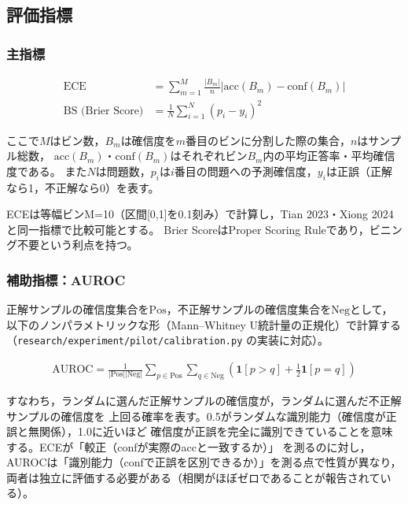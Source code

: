 \documentclass[11pt,a4paper,oneside]{article}
\begin{document}
\subsection{評価指標}

\subsubsection*{主指標}

\begin{align}
  \text{ECE} &= \sum_{m=1}^{M} \frac{|B_m|}{n} \left|\text{acc}(B_m) - \text{conf}(B_m)\right| \\
  \text{BS (Brier Score)} &= \frac{1}{N} \sum_{i=1}^{N} (p_i - y_i)^2
\end{align}

ここで$M$はビン数，$B_m$は確信度を$m$番目のビンに分割した際の集合，$n$はサンプル総数，
$\text{acc}(B_m)$・$\text{conf}(B_m)$はそれぞれビン$B_m$内の平均正答率・平均確信度である。
また$N$は問題数，$p_i$は$i$番目の問題への予測確信度，$y_i$は正誤（正解なら1，不正解なら0）を表す。

ECEは等幅ビンM=10（区間[0,1]を0.1刻み）で計算し，Tian 2023・Xiong 2024と同一指標で比較可能とする。
Brier ScoreはProper Scoring Ruleであり，ビニング不要という利点を持つ。

\subsubsection*{補助指標：AUROC}

正解サンプルの確信度集合を$\text{Pos}$，不正解サンプルの確信度集合を$\text{Neg}$として，
以下のノンパラメトリックな形（Mann–Whitney U統計量の正規化）で計算する
（\texttt{research/experiment/pilot/calibration.py} の実装に対応）。

\begin{align}
  \text{AUROC} = \frac{1}{|\text{Pos}||\text{Neg}|} \sum_{p \in \text{Pos}} \sum_{q \in \text{Neg}}
  \left( \mathbf{1}[p > q] + \tfrac{1}{2}\mathbf{1}[p = q] \right)
\end{align}

すなわち，ランダムに選んだ正解サンプルの確信度が，ランダムに選んだ不正解サンプルの確信度を
上回る確率を表す。0.5がランダムな識別能力（確信度が正誤と無関係），1.0に近いほど
確信度が正誤を完全に識別できていることを意味する。ECEが「較正（confが実際のaccと一致するか）」
を測るのに対し，AUROCは「識別能力（confで正誤を区別できるか）」を測る点で性質が異なり，
両者は独立に評価する必要がある（相関がほぼゼロであることが報告されている）。
\end{document}
